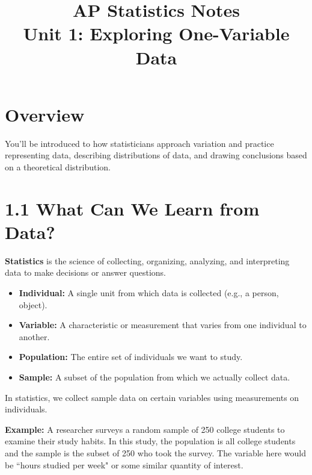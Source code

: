 


\fancyhf{}
\cfoot{\thepage}

\title{
  AP Statistics Notes\\[1ex]
  \large Unit 1: Exploring One-Variable Data
}
\author{}
\date{}



\maketitle


\section*{Overview}
You'll be introduced to how statisticians approach variation and practice representing data, describing distributions of data, and drawing conclusions based on a theoretical distribution.
\bigskip


\section*{1.1 What Can We Learn from Data?}
\textbf{Statistics} is the science of collecting, organizing, analyzing, and interpreting data to make decisions or answer questions. \\
\begin{tcolorbox}[title=Key Terms, colback=blue!5!white, colframe=blue!75!black, breakable]
\begin{itemize}
    \item \textbf{Individual:} A single unit from which data is collected (e.g., a person, object). 
    \item \textbf{Variable:} A characteristic or measurement that varies from one individual to another.
    \item \textbf{Population:} The entire set of individuals we want to study.
    \item \textbf{Sample:} A subset of the population from which we actually collect data.
\end{itemize}
\end{tcolorbox} 
In statistics, we collect sample data on certain variables using measurements on individuals. \\
\par\medskip
\textbf{Example:} A researcher surveys a random sample of 250 college students to examine their study habits. In this study, the population is all college students and the sample is the subset of 250 who took the survey. The variable here would be ``hours studied per week" or some similar quantity of interest.
\bigskip


